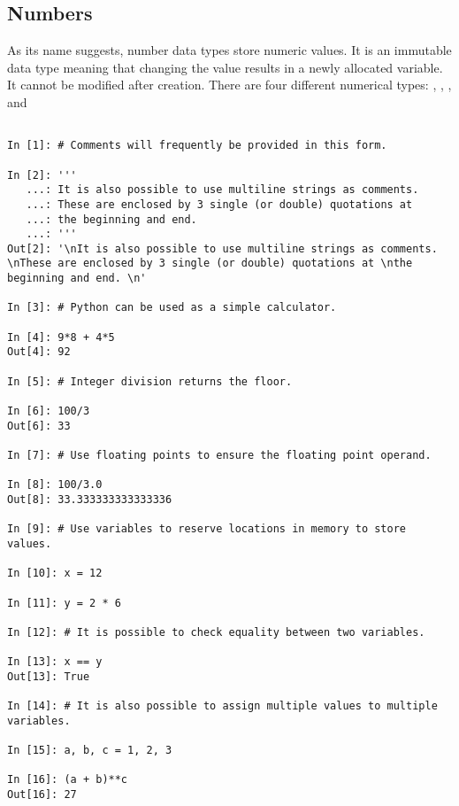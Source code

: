\subsection*{Numbers}
\begin{example}
As its name suggests, number data types store numeric values. 
It is an immutable data type meaning that changing the value results in a 
newly allocated variable. It cannot be modified after creation. 
There are four different numerical types: , , 
, and 

\begin{lstlisting}

In [1]: # Comments will frequently be provided in this form. 

In [2]: '''
   ...: It is also possible to use multiline strings as comments. 
   ...: These are enclosed by 3 single (or double) quotations at 
   ...: the beginning and end. 
   ...: '''
Out[2]: '\nIt is also possible to use multiline strings as comments. \nThese are enclosed by 3 single (or double) quotations at \nthe beginning and end. \n'

In [3]: # Python can be used as a simple calculator.

In [4]: 9*8 + 4*5
Out[4]: 92

In [5]: # Integer division returns the floor.

In [6]: 100/3
Out[6]: 33

In [7]: # Use floating points to ensure the floating point operand.

In [8]: 100/3.0
Out[8]: 33.333333333333336

In [9]: # Use variables to reserve locations in memory to store values.

In [10]: x = 12

In [11]: y = 2 * 6

In [12]: # It is possible to check equality between two variables.

In [13]: x == y
Out[13]: True

In [14]: # It is also possible to assign multiple values to multiple variables.

In [15]: a, b, c = 1, 2, 3

In [16]: (a + b)**c
Out[16]: 27

\end{lstlisting}
\end{example}

